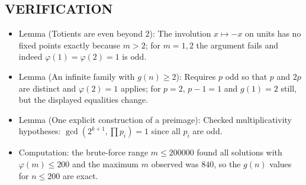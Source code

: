 \subsection*{VERIFICATION}
\begin{itemize}
\item Lemma (Totients are even beyond $2$): The involution $x\mapsto -x$ on units has no fixed points exactly because $m>2$; for $m=1,2$ the argument fails and indeed $\varphi(1)=\varphi(2)=1$ is odd.
\item Lemma (An infinite family with $g(n)\ge 2$): Requires $p$ odd so that $p$ and $2p$ are distinct and $\varphi(2)=1$ applies; for $p=2$, $p-1=1$ and $g(1)=2$ still, but the displayed equalities change.
\item Lemma (One explicit construction of a preimage): Checked multiplicativity hypotheses: $\gcd(2^{k+1},\prod p_i)=1$ since all $p_i$ are odd.
\item Computation: the brute-force range $m\le 200000$ found all solutions with $\varphi(m)\le 200$ and the maximum $m$ observed was $840$, so the $g(n)$ values for $n\le 200$ are exact.
\end{itemize}

